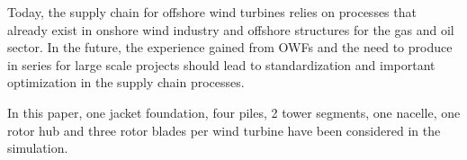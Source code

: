 Today, the supply chain for offshore wind turbines relies on processes that already exist in onshore wind industry and offshore structures for the gas and oil sector. In the future, the experience gained from OWFs and the need to produce in series for large scale projects should lead to standardization and important optimization in the supply chain processes.


In this paper, one jacket foundation, four piles, 2 tower segments, one nacelle, one rotor hub and three rotor blades per wind turbine have been considered in the simulation.
